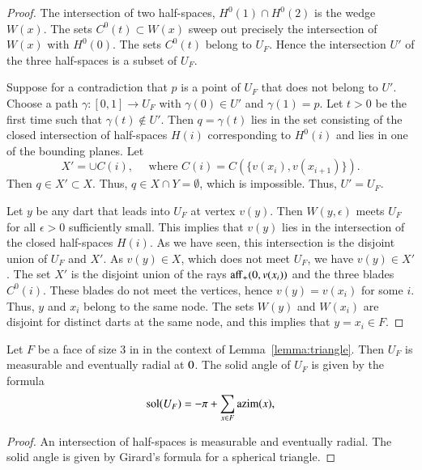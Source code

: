 {\begin{proof} The intersection of two half-spaces, $H^0(1)\cap H^0(2)$ is
the wedge $W(x)$.   The sets $C^0(t)\subset W(x)$ sweep out precisely
the intersection of $W(x)$ with $H^0(0)$.  The sets $C^0(t)$ belong to
$U_F$.  Hence the intersection $U'$ of the three half-spaces is a subset of $U_F$.

Suppose for a contradiction 
that $p$ is a point of $U_F$ that does not belong to $U'$.  Choose a path $\gamma:[0,1]\to U_F$ with $\gamma(0)\in U'$ and $\gamma(1)=p$.  Let $t>0$ be the first time such that $\gamma(t)\not\in U'$.  Then $q=\gamma(t)$ lies in the set consisting of the closed intersection of half-spaces $H(i)$ corresponding to $H^0(i)$ and lies
in one of the bounding planes.  Let 
$$
X' = \cup C(i),\quad\text{ where } C(i)=C(\{v(x_i),v(x_{i+1})\}).
$$
Then $q\in X'\subset X$.  Thus,
$q\in X\cap Y = \emptyset$, which is impossible.  Thus, $U'=U_F$.

Let $y$ be any dart that leads into $U_F$ at vertex $v(y)$.  Then
$W(y,\epsilon)$ meets $U_F$ for all $\epsilon>0$ sufficiently small.
This implies that $v(y)$ lies in the intersection of the closed half-spaces $H(i)$.  As we have seen, this intersection is the disjoint union of $U_F$ and
$X'$.  As $v(y)\in X$, which does not meet $U_F$, we have $v(y)\in X'$.
The set $X'$ is the disjoint union of the rays ${\operatorname{aff}}_+(0,v(x_i))$ and
the three blades $C^0(i)$.  These blades do not meet the vertices, hence
$v(y)=v(x_i)$ for some $i$.  Thus, $y$ and $x_i$ belong to the same
node.  The sets $W(y)$ and $W( x_i)$ are disjoint for distinct darts at the same
node, and this implies that $y=x_i\in F$.
\end{proof}

\begin{corollary}\label{lemma:girard-component}
Let $F$ be a face of size $3$ in in the context of Lemma~\ref{lemma:triangle}.  Then $U_F$ is measurable and eventually radial at $0$.
The solid angle of $U_F$ is given by the formula
$$
\operatorname{sol}(U_F) = -\pi + \sum_{x\in F}{\operatorname{azim}}(x),
$$
\end{corollary}

\begin{proof} An intersection of half-spaces is measurable and
eventually radial.  The solid angle is given by Girard's formula for
a spherical triangle.
\end{proof}

}
